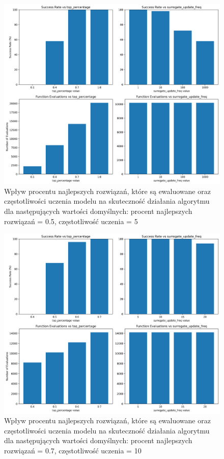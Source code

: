 \documentclass{article}
\begin{document}
\begin{figure}[H]
    \centering
    \includegraphics[width=\textwidth]{surrogate_de_parameter_tuning_results1.png}
    \caption{Wpływ procentu najlepszych rozwiązań, które są ewaluowane oraz częstotliwości uczenia modelu na skuteczność działania algorytmu dla następujących wartości domyślnych: procent najlepszych rozwiązań = 0.5, częstotliwość uczenia = 5}
    \label{fig:surogate_de_parameter_results1}
\end{figure}

\begin{figure}[H]
    \centering
    \includegraphics[width=\textwidth]{surrogate_de_parameter_tuning_results2.png}
    \caption{Wpływ procentu najlepszych rozwiązań, które są ewaluowane oraz częstotliwości uczenia modelu na skuteczność działania algorytmu dla następujących wartości domyślnych: procent najlepszych rozwiązań = 0.7, częstotliwość uczenia = 10}
    \label{fig:surogate_de_parameter_results2}
\end{figure}
\end{document}
